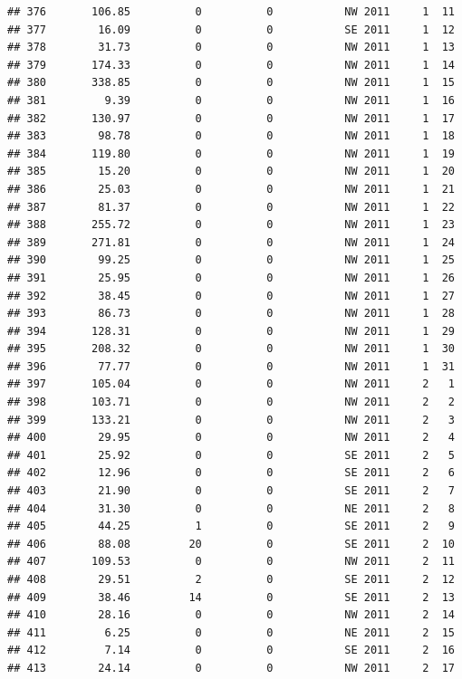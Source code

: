 \documentclass[
]{article}
\begin{document}
\begin{verbatim}
## 376       106.85          0          0           NW 2011     1  11
## 377        16.09          0          0           SE 2011     1  12
## 378        31.73          0          0           NW 2011     1  13
## 379       174.33          0          0           NW 2011     1  14
## 380       338.85          0          0           NW 2011     1  15
## 381         9.39          0          0           NW 2011     1  16
## 382       130.97          0          0           NW 2011     1  17
## 383        98.78          0          0           NW 2011     1  18
## 384       119.80          0          0           NW 2011     1  19
## 385        15.20          0          0           NW 2011     1  20
## 386        25.03          0          0           NW 2011     1  21
## 387        81.37          0          0           NW 2011     1  22
## 388       255.72          0          0           NW 2011     1  23
## 389       271.81          0          0           NW 2011     1  24
## 390        99.25          0          0           NW 2011     1  25
## 391        25.95          0          0           NW 2011     1  26
## 392        38.45          0          0           NW 2011     1  27
## 393        86.73          0          0           NW 2011     1  28
## 394       128.31          0          0           NW 2011     1  29
## 395       208.32          0          0           NW 2011     1  30
## 396        77.77          0          0           NW 2011     1  31
## 397       105.04          0          0           NW 2011     2   1
## 398       103.71          0          0           NW 2011     2   2
## 399       133.21          0          0           NW 2011     2   3
## 400        29.95          0          0           NW 2011     2   4
## 401        25.92          0          0           SE 2011     2   5
## 402        12.96          0          0           SE 2011     2   6
## 403        21.90          0          0           SE 2011     2   7
## 404        31.30          0          0           NE 2011     2   8
## 405        44.25          1          0           SE 2011     2   9
## 406        88.08         20          0           SE 2011     2  10
## 407       109.53          0          0           NW 2011     2  11
## 408        29.51          2          0           SE 2011     2  12
## 409        38.46         14          0           SE 2011     2  13
## 410        28.16          0          0           NW 2011     2  14
## 411         6.25          0          0           NE 2011     2  15
## 412         7.14          0          0           SE 2011     2  16
## 413        24.14          0          0           NW 2011     2  17

\end{verbatim}
\end{document}
